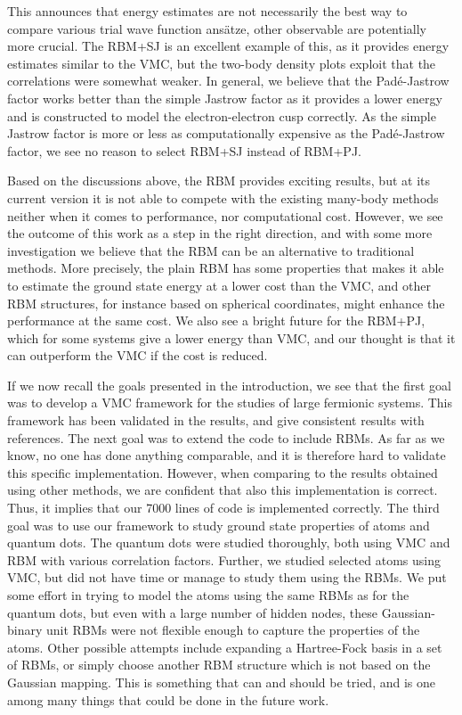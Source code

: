 This announces that energy estimates are not necessarily the best way to compare various trial wave function ansätze, other observable are potentially more crucial. The RBM+SJ is an excellent example of this, as it provides energy estimates similar to the VMC, but the two-body density plots exploit that the correlations were somewhat weaker. In general, we believe that the Padé-Jastrow factor works better than the simple Jastrow factor as it provides a lower energy and is constructed to model the electron-electron cusp correctly. As the simple Jastrow factor is more or less as computationally expensive as the Padé-Jastrow factor, we see no reason to select RBM+SJ instead of RBM+PJ.

Based on the discussions above, the RBM provides exciting results, but at its current version it is not able to compete with the existing many-body methods neither when it comes to performance, nor computational cost. However, we see the outcome of this work as a step in the right direction, and with some more investigation we believe that the RBM can be an alternative to traditional methods. More precisely, the plain RBM has some properties that makes it able to estimate the ground state energy at a lower cost than the VMC, and other RBM structures, for instance based on spherical coordinates, might enhance the performance at the same cost. We also see a bright future for the RBM+PJ, which for some systems give a lower energy than VMC, and our thought is that it can outperform the VMC if the cost is reduced.

If we now recall the goals presented in the introduction, we see that the first goal was to develop a VMC framework for the studies of large fermionic systems. This framework has been validated in the results, and give consistent results with references. The next goal was to extend the code to include RBMs. As far as we know, no one has done anything comparable, and it is therefore hard to validate this specific implementation. However, when comparing to the results obtained using other methods, we are confident that also this implementation is correct. Thus, it implies that our 7000 lines of code is implemented correctly. The third goal was to use our framework to study ground state properties of atoms and quantum dots. The quantum dots were studied thoroughly, both using VMC and RBM with various correlation factors. Further, we studied selected atoms using VMC, but did not have time or manage to study them using the RBMs. We put some effort in trying to model the atoms using the same RBMs as for the quantum dots, but even with a large number of hidden nodes, these Gaussian-binary unit RBMs were not flexible enough to capture the properties of the atoms. Other possible attempts include expanding a Hartree-Fock basis in a set of RBMs, or simply choose another RBM structure which is not based on the Gaussian mapping. This is something that can and should be tried, and is one among many things that could be done in the future work. 

